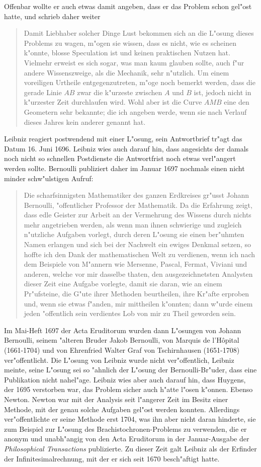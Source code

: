 Offenbar wollte er auch etwas damit angeben, dass er das Problem
schon gel"ost hatte, und schrieb daher weiter
\begin{quote}
Damit Liebhaber solcher Dinge Lust bekommen sich an die L"osung
dieses Problems zu wagen, m"ogen sie wissen, dass es nicht, wie es
scheinen k"onnte, blosse Speculation ist und keinen praktischen
Nutzen hat. Vielmehr erweist es sich sogar, was man kaum glauben
sollte, auch f"ur andere Wissenszweige, als die Mechanik, sehr
n"utzlich. Um einem voreiligen Urtheile entgegenzutreten, m"oge noch
bemerkt werden, dass die gerade Linie $AB$ zwar die k"urzeste zwischen
$A$ und $B$ ist, jedoch nicht in k"urzester Zeit durchlaufen wird. Wohl
aber ist die Curve $AMB$ eine den Geometern sehr bekannte; die ich
angeben werde, wenn sie nach Verlauf dieses Jahres kein anderer
genannt hat.
\end{quote}
Leibniz reagiert postwendend mit einer L"osung, sein Antwortbrief tr"agt
das Datum 16. Juni 1696. Leibniz wies auch darauf hin, dass angesichts
der damals noch nicht so schnellen Postdienste die Antwortfrist noch
etwas verl"angert werden sollte.
Bernoulli publiziert daher im Januar 1697 nochmals einen nicht
minder schw"ulstigen Aufruf:
\begin{quote}
Die scharfsinnigsten Mathematiker des ganzen Erdkreises gr"usst
Johann Bernoulli, "offentlicher Professor der Mathematik.
Da die Erfahrung zeigt, dass edle Geister zur Arbeit an der Vermehrung
des Wissens durch nichts mehr angetrieben werden, als wenn man ihnen
schwierige und zugleich n"utzliche Aufgaben vorlegt, durch deren
L"osung sie einen ber"uhmten Namen erlangen und sich bei der Nachwelt
ein ewiges Denkmal setzen, so hoffte ich den Dank der mathematischen
Welt zu verdienen, wenn ich nach dem Beispiele von M"annern wie
Mersenne, Pascal, Fermat, Viviani und anderen, welche vor mir
dasselbe thaten, den ausgezeichnetsten Analysten dieser Zeit eine
Aufgabe vorlegte, damit sie daran, wie an einem Pr"ufsteine, die
G"ute ihrer Methoden beurtheilen, ihre Kr"afte erproben und, wenn sie
etwas f"anden, mir mittheilen k"onnten; dann w"urde einem jeden
"offentlich sein verdientes Lob von mir zu Theil geworden sein.
\end{quote}
Im Mai-Heft 1697 der Acta Eruditorum wurden dann L"osungen von
Johann Bernoulli, seinem "alteren Bruder Jakob Bernoulli, von Marquis
de l'H\^opital (1661-1704) und
von Ehrenfried Walter Graf von Tschirnhausen (1651-1708)
ver"offentlicht.
Die L"osung von Leibniz wurde nicht ver"offentlich, Leibniz
meinte, seine L"osung sei so "ahnlich der L"osung der Bernoulli-Br"uder,
dass eine Publikation nicht nahel"age. Leibniz wies aber auch darauf hin,
dass Huygens, der 1695 verstorben war, das Problem sicher auch h"atte l"osen
k"onnen. Ebenso Newton.
Newton war mit der Analysis seit l"angerer Zeit im Besitz einer Methode,
mit der genau solche Aufgaben gel"ost werden konnten.
Allerdings ver"offentlichte er seine Methode erst 1704, was ihn
aber nicht daran hinderte, sie zum Beispiel zur L"osung des
Brachistochronen-Problems zu verwenden, die er anonym und unabh"angig von
den Acta Eruditorum in der Januar-Ausgabe der {\it Philosophical Transactions}
publizierte.
Zu dieser Zeit galt Leibniz als der Erfinder der Infinitesimalrechnung,
mit der er sich seit 1670 besch"aftigt hatte.

